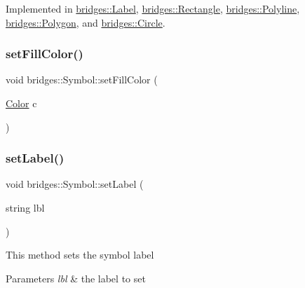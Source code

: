 Implemented in \mbox{\hyperlink{classbridges_1_1_label_af4bdf9e492cf2a2bf3a8be42bd282b44}{bridges\+::\+Label}}, \mbox{\hyperlink{classbridges_1_1_rectangle_a509c9489c6f145b684447851736acac5}{bridges\+::\+Rectangle}}, \mbox{\hyperlink{classbridges_1_1_polyline_a850d2f619466b159c7874317f9eaf0a3}{bridges\+::\+Polyline}}, \mbox{\hyperlink{classbridges_1_1_polygon_a5c3e3bbeda23db712088278a3c82a0a6}{bridges\+::\+Polygon}}, and \mbox{\hyperlink{classbridges_1_1_circle_aaee59a0d8ad00c75f7547bac2cfabd38}{bridges\+::\+Circle}}.

\mbox{\label{classbridges_1_1_symbol_a20315217d30c3c747b5b6da60c08c2c9}} 
\subsubsection{\texorpdfstring{set\+Fill\+Color()}{setFillColor()}}
{\footnotesize\ttfamily void bridges\+::\+Symbol\+::set\+Fill\+Color (\begin{DoxyParamCaption}\item[{\mbox{\hyperlink{classbridges_1_1_color}{Color}}}]{c }\end{DoxyParamCaption})\hspace{0.3cm}{\ttfamily [inline]}}

\mbox{\label{classbridges_1_1_symbol_afd181fe1e860542548efc4244e06f609}} 
\subsubsection{\texorpdfstring{set\+Label()}{setLabel()}}
{\footnotesize\ttfamily void bridges\+::\+Symbol\+::set\+Label (\begin{DoxyParamCaption}\item[{string}]{lbl }\end{DoxyParamCaption})\hspace{0.3cm}{\ttfamily [inline]}}

This method sets the symbol label


\begin{DoxyParams}{Parameters}
{\em lbl} & the label to set \\
\hline
\end{DoxyParams}
\mbox{\label{classbridges_1_1_symbol_a9a1bdebb8dcec2871243a269e618a351}} 
